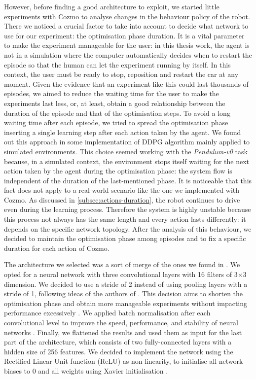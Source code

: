 However, before finding a good architecture to exploit, we started little experiments with Cozmo to analyse changes in the behaviour policy of the robot.
There we noticed a crucial factor to take into account to decide what network to use for our experiment: the optimisation phase duration.
It is a vital parameter to make the experiment manageable for the user: in this thesis work, the agent is not in a simulation where the computer automatically decides when to restart the episode so that the human can let the experiment running by itself.
In this context, the user must be ready to stop, reposition and restart the car at any moment.
Given the evidence that an experiment like this could last thousands of episodes, we aimed to reduce the waiting time for the user to make the experiments last less, or, at least, obtain a good relationship between the duration of the episode and that of the optimisation steps.
To avoid a long waiting time after each episode, we tried to spread the optimisation phase inserting a single learning step after each action taken by the agent.
We found out this approach in some implementation of DDPG algorithm mainly applied to simulated environments.
This choice seemed working with the \textit{Pendulum-v0} task because, in a simulated context, the environment stops itself waiting for the next action taken by the agent during the optimisation phase: the system flow is independent of the duration of the last-mentioned phase.
It is noticeable that this fact does not apply to a real-world scenario like the one we implemented with Cozmo.
As discussed in \vref{subsec:actions-duration}, the robot continues to drive even during the learning process.
Therefore the system is highly unstable because this process not always has the same length and every action lasts differently: it depends on the specific network topology.
After the analysis of this behaviour, we decided to maintain the optimisation phase among episodes and to fix a specific duration for each action of Cozmo.

The architecture we selected was a sort of merge of the ones we found in \cite{kendall2018learning,kendall2019learning,haarnoja2018alg}.
We opted for a neural network with three convolutional layers with 16 filters of 3$\times$3 dimension.
We decided to use a stride of 2 instead of using pooling layers with a stride of 1, following ideas of the authors of \cite{kendall2018learning,kendall2019learning}.
This decision aims to shorten the optimisation phase and obtain more manageable experiments without impacting performance excessively \cite{springenberg2014striving}.
We applied batch normalisation after each convolutional level to improve the speed, performance, and stability of neural networks \cite{ioffe2015batch}.
Finally, we flattened the results and used them as input for the last part of the architecture, which consists of two fully-connected layers with a hidden size of 256 features.
We decided to implement the network using the Rectified Linear Unit function (ReLU) as non-linearity, to initialise all network biases to 0 and all weights using Xavier initialisation \cite{glorot2010understanding}.

